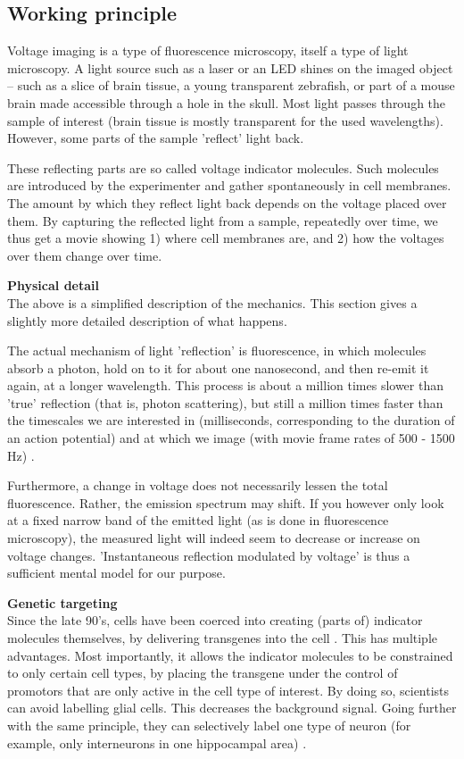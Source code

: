 \subsection{Working principle}

Voltage imaging is a type of fluorescence microscopy, itself a type of light microscopy. A light source such as a laser or an LED shines on the imaged object -- such as a slice of brain tissue, a young transparent zebrafish, or part of a mouse brain made accessible through a hole in the skull. Most light passes through the sample of interest (brain tissue is mostly transparent for the used wavelengths). However, some parts of the sample 'reflect' light back.

These reflecting parts are so called voltage indicator molecules. Such molecules are introduced by the experimenter and gather spontaneously in cell membranes. The amount by which they reflect light back depends on the voltage placed over them. By capturing the reflected light from a sample, repeatedly over time, we thus get a movie showing 1) where cell membranes are, and 2) how the voltages over them change over time.

\textbf{Physical detail}\\
The above is a simplified description of the mechanics. This section gives a slightly more detailed description of what happens.

The actual mechanism of light 'reflection' is fluorescence, in which molecules absorb a photon, hold on to it for about one nanosecond, and then re-emit it again, at a longer wavelength. This process is about a million times slower than 'true' reflection (that is, photon scattering), but still a million times faster than the timescales we are interested in (milliseconds, corresponding to the duration of an action potential) and at which we image (with movie frame rates of 500 - 1500 Hz) \cite{Valeur2012MolecularFluorescencePrinciples,Cox2019FundamentalsFluorescenceImaging}.

Furthermore, a change in voltage does not necessarily lessen the total fluorescence. Rather, the emission spectrum may shift. If you however only look at a fixed narrow band of the emitted light (as is done in fluorescence microscopy), the measured light will indeed seem to decrease or increase on voltage changes.
'Instantaneous reflection modulated by voltage' is thus a sufficient mental model for our purpose.

\textbf{Genetic targeting}\\
Since the late 90's, cells have been coerced into creating (parts of) indicator molecules themselves, by delivering transgenes into the cell \cite{Siegel1997GeneticallyEncodedOptical}.
This has multiple advantages. Most importantly, it allows the indicator molecules to be constrained to only certain cell types, by placing the transgene under the control of promotors that are only active in the cell type of interest. By doing so, scientists can avoid labelling glial cells. This decreases the background signal. Going further with the same principle, they can selectively label one type of neuron (for example, only interneurons in one hippocampal area) \cite{Hochbaum2014AllopticalElectrophysiologyMammaliana}.

